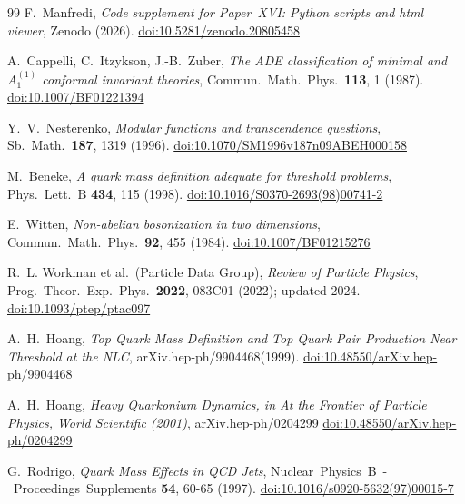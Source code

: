 \documentclass[11pt,a4paper]{article}
\theoremstyle{definition}\newtheorem{definition}[theorem]{Definition}
\theoremstyle{remark}
\theoremstyle{definition}\newtheorem{construction}[theorem]{Construction}
\begin{document}
\begin{thebibliography}{99}
F.~Manfredi,
\textit{Code supplement for Paper~XVI: Python scripts and html viewer},
Zenodo (2026).
\href{https://doi.org/10.5281/zenodo.20805458}{doi:10.5281/zenodo.20805458}

A.~Cappelli, C.~Itzykson, J.-B.~Zuber,
\textit{The ADE classification of minimal and $A_1^{(1)}$ conformal
invariant theories},
Commun.\ Math.\ Phys.\ \textbf{113}, 1 (1987).
\href{https://doi.org/10.1007/BF01221394}{doi:10.1007/BF01221394}

Y.~V.~Nesterenko,
\textit{Modular functions and transcendence questions},
Sb.\ Math.\ \textbf{187}, 1319 (1996).
\href{https://doi.org/10.1070/SM1996v187n09ABEH000158}{doi:10.1070/SM1996v187n09ABEH000158}

M.~Beneke,
\textit{A quark mass definition adequate for threshold problems},
Phys.\ Lett.\ B \textbf{434}, 115 (1998).
\href{https://doi.org/10.1016/S0370-2693(98)00741-2}{doi:10.1016/S0370-2693(98)00741-2}

E.~Witten,
\textit{Non-abelian bosonization in two dimensions},
Commun.\ Math.\ Phys.\ \textbf{92}, 455 (1984).
\href{https://doi.org/10.1007/BF01215276}{doi:10.1007/BF01215276}

R.~L. Workman et al.\ (Particle Data Group),
\textit{Review of Particle Physics},
Prog.\ Theor.\ Exp.\ Phys.\ \textbf{2022}, 083C01 (2022);
updated 2024.
\href{https://doi.org/10.1093/ptep/ptac097}{doi:10.1093/ptep/ptac097}

A.~H.~Hoang,
\textit{Top Quark Mass Definition and Top Quark Pair
Production Near Threshold at the NLC},
arXiv.hep-ph/9904468(1999).
\href{https://doi.org/10.48550/arXiv.hep-ph/9904468}{doi:10.48550/arXiv.hep-ph/9904468}

A.~H.~Hoang,
\textit{Heavy Quarkonium Dynamics,
in \textit{At the Frontier of Particle Physics}, World Scientific (2001)},
arXiv.hep-ph/0204299
\href{https://doi.org/10.48550/arXiv.hep-ph/0204299}{doi:10.48550/arXiv.hep-ph/0204299}

G.~Rodrigo,
\textit{Quark Mass Effects in QCD Jets},
Nuclear\ Physics\ B\ -\ Proceedings\ Supplements \textbf{54}, 60-65 (1997).
\href{https://doi.org/10.1016/s0920-5632(97)00015-7}{doi:10.1016/s0920-5632(97)00015-7}

\end{thebibliography}
\end{document}
